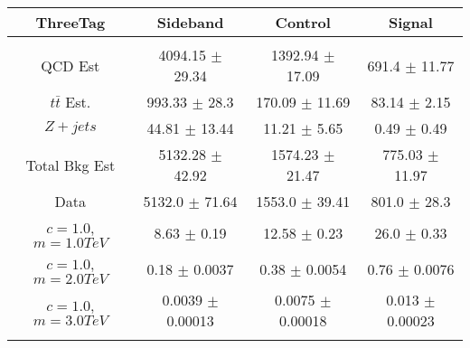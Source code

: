 \begin{footnotesize} 
\begin{tabular}{c|c|c|c} 
ThreeTag & Sideband & Control & Signal \\ 
\hline\hline 
& & & \\ 
QCD Est & 4094.15 $\pm$ 29.34 & 1392.94 $\pm$ 17.09 & 691.4 $\pm$ 11.77\\ 
$t\bar{t}$ Est.  & 993.33 $\pm$ 28.3 & 170.09 $\pm$ 11.69 & 83.14 $\pm$ 2.15\\ 
$Z+jets$ & 44.81 $\pm$ 13.44 & 11.21 $\pm$ 5.65 & 0.49 $\pm$ 0.49\\ 
Total Bkg Est & 5132.28 $\pm$ 42.92 & 1574.23 $\pm$ 21.47 & 775.03 $\pm$ 11.97\\ 
Data & 5132.0 $\pm$ 71.64 & 1553.0 $\pm$ 39.41 & 801.0 $\pm$ 28.3\\ 
$c=1.0$,$m=1.0TeV$ & 8.63 $\pm$ 0.19 & 12.58 $\pm$ 0.23 & 26.0 $\pm$ 0.33\\ 
$c=1.0$,$m=2.0TeV$ & 0.18 $\pm$ 0.0037 & 0.38 $\pm$ 0.0054 & 0.76 $\pm$ 0.0076\\ 
$c=1.0$,$m=3.0TeV$ & 0.0039 $\pm$ 0.00013 & 0.0075 $\pm$ 0.00018 & 0.013 $\pm$ 0.00023\\ 
& & & \\ 
\hline\hline 
\end{tabular} 
\end{footnotesize} 
\newline 
